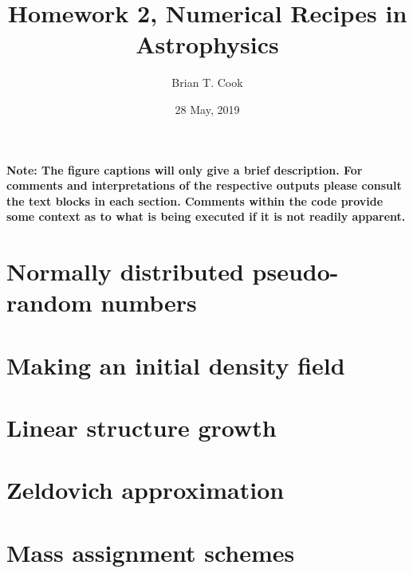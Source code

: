 \documentclass[10pt]{article}
\title{Homework 2, Numerical Recipes in Astrophysics}
\author{Brian T. Cook}
\date{28 May, 2019}
\begin{document}
\maketitle

\textbf{Note: The figure captions will only give a brief description. For comments and interpretations of the respective outputs please consult the text blocks in each section. Comments within the code provide some context as to what is being executed if it is not readily apparent.}

\section{Normally distributed pseudo-random numbers}











\section{Making an initial density field}



\section{Linear structure growth}



\section{Zeldovich approximation}







%

\section{Mass assignment schemes}


\end{document}
